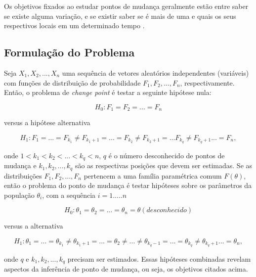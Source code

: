 Os objetivos fixados ao estudar pontos de mudança geralmente estão entre saber se existe alguma variação, e se existir saber se é mais de uma e quais os seus respectivos locais em um determinado tempo \cite{Chen1-2000}.

\subsection{Formulação do Problema}

Seja $X_1, X_2, ..., X_n$ uma sequência de vetores aleatórios independentes (variáveis) com funções de distribuição de probabilidade $F_1, F_2, ..., F_n$, respectivamente. Então, o problema de \textit{change point} é testar a seguinte hipótese nula:

\begin{equation}
    H_0 : F_1 = F_2 = ... = F_n
    \label{eq:cpd-hupotese-nula-1}
\end{equation}

versus a hipótese alternativa

\begin{equation}
    H_{1} : F_{1} = ... = F_{k_1}\neq F_{{k_1}+1} = ... = F_{k_2}\neq F_{{k_2}+1} = ... F_{k_q}\neq F_{{k_q}+1} ... = F_{n},
    \label{eq:cpd-hipotese-alternativa-1}
\end{equation}

onde $1 < k_1 < k_2 < ... < k_q <n$, $q$ é o número desconhecido de pontos de mudança e $k_1, k_2, ..., k_q$ são as respectivas posições que devem ser estimadas. Se as distribuições $F_1, F_2, ..., F_n$ pertencem a uma família paramétrica comum $F(\theta)$, 
então o problema do ponto de mudança é testar hipóteses sobre os parâmetros da população $\theta_i$, com a sequência $i = 1 ..... n$

\begin{equation}
    H_0 : \theta_{1} = \theta_{2} = ... = \theta_{n} = \theta (desconhecido)
    \label{eq:cpd-hupotese-nula-2}
\end{equation}

versus a alternativa

\begin{equation}
    H_1 : \theta_{1} = ... = \theta_{k_1} \not = \theta_{{k_1}+1} = ... = \theta_{2} \not = ... \not = \theta_{{k_q}-1} = ... = \theta_{k_q} \not = \theta_{{k_q}+1}... = \theta_{n},
    \label{eq:cpd-hipotese-alternativa-2}
\end{equation}

onde $q$ e $k_1, k_2, ..., k_q$ precisam ser estimados. Essas hipóteses combinadas revelam aspectos da inferência de ponto de mudança, ou seja, os objetivos citados acima. 

